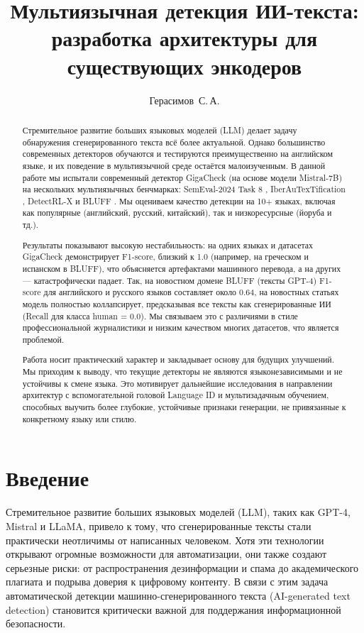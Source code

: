 \documentclass{article}
\title{Мультиязычная детекция ИИ-текста: разработка архитектуры для существующих энкодеров}
\author{
  Герасимов~С.\,А.\\
}
\date{}
\begin{document}
\maketitle
\renewcommand{\abstractname}{Аннотация}
\begin{abstract}
Стремительное развитие больших языковых моделей (LLM) делает задачу обнаружения сгенерированного текста всё более актуальной. Однако большинство современных детекторов обучаются и тестируются преимущественно на английском языке, и их поведение в мультиязычной среде остаётся малоизученным. В данной работе мы испытали современный детектор GigaCheck \cite{gigacheck2026}(на основе модели Mistral-7B) на нескольких мультиязычных бенчмарках: SemEval-2024 Task 8 \cite{semeval2024}, IberAuTexTification \cite{iberautext2024}, DetectRL-X \cite{detectrlx2026} и BLUFF \cite{bluff2026}. Мы оцениваем качество детекции на 10+ языках, включая как популярные (английский, русский, китайский), так и низкоресурсные (йоруба и тд.).

Результаты показывают высокую нестабильность: на одних языках и датасетах GigaCheck демонстрирует F1-score, близкий к 1.0 (например, на греческом и испанском в BLUFF), что объясняется артефактами машинного перевода, а на других — катастрофически падает. Так, на новостном домене BLUFF (тексты GPT-4) F1-score для английского и русского языков составляет около 0.64, на новостных статьях модель полностью коллапсирует, предсказывая все тексты как сгенерированные ИИ (Recall для класса human = 0.0). Мы связываем это с различиями в стиле профессиональной журналистики и низким качеством многих датасетов, что является проблемой.

Работа носит практический характер и закладывает основу для будущих улучшений. Мы приходим к выводу, что текущие детекторы не являются языконезависимыми и не устойчивы к смене языка. Это мотивирует дальнейшие исследования в направлении архитектур с вспомогательной головой Language ID и мультизадачным обучением, способных выучить более глубокие, устойчивые признаки генерации, не привязанные к конкретному языку или стилю.
\end{abstract}

\newpage

\section{Введение}
Стремительное развитие больших языковых моделей (LLM), таких как GPT-4, Mistral и LLaMA, привело к тому, что сгенерированные тексты стали практически неотличимы от написанных человеком. Хотя эти технологии открывают огромные возможности для автоматизации, они также создают серьезные риски: от распространения дезинформации и спама до академического плагиата и подрыва доверия к цифровому контенту. В связи с этим задача автоматической детекции машинно-сгенерированного текста (AI-generated text detection) становится критически важной для поддержания информационной безопасности.
\end{document}
